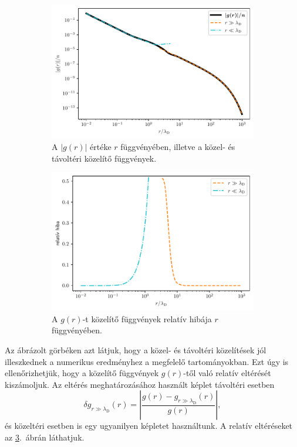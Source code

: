 \documentclass[a4paper,12pt,titlepage]{article}
\begin{document}
\begin{figure}[h!]
	\centering
	\begin{subfigure}{0.48\linewidth}
		\centering
		\includegraphics[width=\linewidth]{G_sc.pdf}
		\caption{\centering A $\left| g(r) \right|$ értéke $r$ függvényében, illetve a közel- és távoltéri közelítő függvények.}
		\label{G-sc-fig}
	\end{subfigure}
	\begin{subfigure}{0.48\linewidth}
		\centering
		\includegraphics[width=0.98\linewidth]{G_sc_error.pdf}
		\caption{\centering A $g(r)$-t közelítő függvények relatív hibája $r$ függvényében.}
		\label{G-sc-error-fig}
	\end{subfigure}
	\caption{}
\end{figure}

Az ábrázolt görbéken azt látjuk, hogy a közel- és távoltéri közelítések jól illeszkednek a numerikus eredményhez a megfelelő tartományokban.  Ezt úgy is ellenőrizhetjük, hogy a közelítő függvények $g(r)$-től való relatív eltérését kiszámoljuk.  Az eltérés meghatározásához használt képlet távoltéri esetben
$$ \delta g_{r \gg \lambda_\text{D}}(r) = \left| \frac{g(r) - g_{r \gg \lambda_\text{D}}(r)}{g(r)} \right|, $$
és közeltéri esetben is egy ugyanilyen képletet használtunk.  A relatív eltéréseket az \ref{G-sc-error-fig}.\ ábrán láthatjuk.
\end{document}
